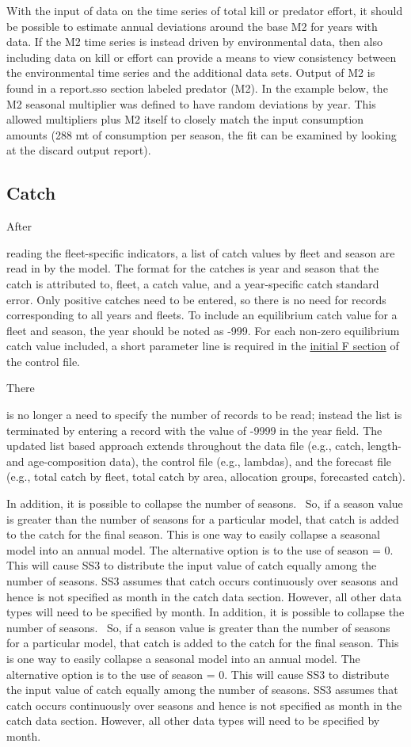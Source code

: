 With the input of data on the time series of total kill or predator effort, it should be possible to estimate annual deviations around the base M2 for years with data. If the M2 time series is instead driven by environmental data, then also including data on kill or effort can provide a means to view consistency between the environmental time series and the additional data sets. Output of M2 is found in a report.sso section labeled predator (M2). In the example below, the M2 seasonal multiplier was defined to have random deviations by year. This allowed multipliers plus M2 itself to closely match the input consumption amounts (288 mt of consumption per season, the fit can be examined by looking at the discard output report).


\subsection{Catch}
\hypertarget{CatchFormat}{After} reading the fleet-specific indicators, a list of catch values by fleet and season are read in by the model. The format for the catches is year and season that the catch is attributed to, fleet, a catch value, and a year-specific catch standard error. Only positive catches need to be entered, so there is no need for records corresponding to all years and fleets. To include an equilibrium catch value for a fleet and season, the year should be noted as -999. For each non-zero equilibrium catch value included, a short parameter line is required in the \hyperlink{InitF}{initial F section} of the control file.

\hypertarget{ListBased}{There} is no longer a need to specify the number of records to be read; instead the list is terminated by entering a record with the value of -9999 in the year field. The updated list based approach extends throughout the data file (e.g., catch, length- and age-composition data), the control file (e.g., lambdas), and the forecast file (e.g., total catch by fleet, total catch by area, allocation groups, forecasted catch).

In addition, it is possible to collapse the number of seasons. \ So, if a season value is greater than the number of seasons for a particular model, that catch is added to the catch for the final season. This is one way to easily collapse a seasonal model into an annual model. The alternative option is to the use of season = 0. This will cause SS3 to distribute the input value of catch equally among the number of seasons. SS3 assumes that catch occurs continuously over seasons and hence is not specified as month in the catch data section. However, all other data types will need to be specified by month.
In addition, it is possible to collapse the number of seasons. \ So, if a season value is greater than the number of seasons for a particular model, that catch is added to the catch for the final season. This is one way to easily collapse a seasonal model into an annual model. The alternative option is to the use of season = 0. This will cause SS3 to distribute the input value of catch equally among the number of seasons. SS3 assumes that catch occurs continuously over seasons and hence is not specified as month in the catch data section. However, all other data types will need to be specified by month.

